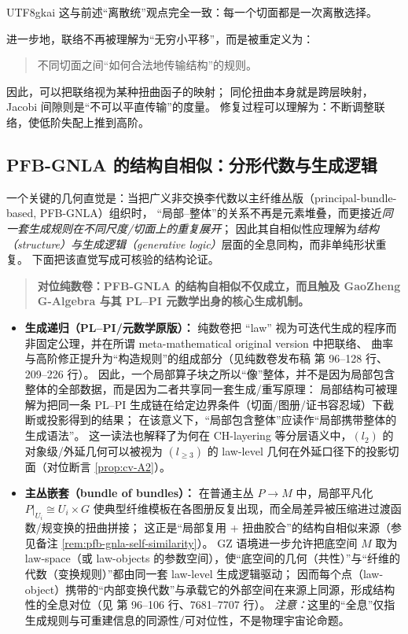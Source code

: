 \documentclass[12pt]{article}
\begin{document}
\begin{CJK*}{UTF8}{gkai}
这与前述“离散统”观点完全一致：每一个切面都是一次离散选择。

进一步地，联络不再被理解为“无穷小平移”，而是被重定义为：
\begin{quote}
不同切面之间“如何合法地传输结构”的规则。
\end{quote}

因此，可以把联络视为某种扭曲函子的映射；
同伦扭曲本身就是跨层映射，Jacobi 间隙则是“不可以平直传输”的度量。
修复过程可以理解为：不断调整联络，使低阶失配上推到高阶。

\subsection{PFB-GNLA 的结构自相似：分形代数与生成逻辑}\label{subsec:pfb-gnla-fractal}

一个关键的几何直觉是：当把广义非交换李代数以主纤维丛版（principal-bundle-based, PFB-GNLA）组织时，
“局部--整体”的关系不再是元素堆叠，而更接近\emph{同一套生成规则在不同尺度/切面上的重复展开}；
因此其自相似性应理解为\emph{结构（structure）与生成逻辑（generative logic）}层面的全息同构，而非单纯形状重复。
下面把该直觉写成可核验的结构论证。
\begin{quote}
\textbf{对位纯数卷：PFB-GNLA 的结构自相似不仅成立，而且触及 GaoZheng G-Algebra 与其 PL--PI 元数学出身的核心生成机制。}
\end{quote}

\begin{itemize}
  \item \textbf{生成递归（PL--PI/元数学原版）：}
        纯数卷把 “law” 视为可迭代生成的程序而非固定公理，并在所谓 meta-mathematical original version 中把联络、
      曲率与高阶修正提升为“构造规则”的组成部分（见纯数卷发布稿\cite{GaoZheng2025GFramework} 第 96--128 行、209--226 行）。
        因此，一个局部算子块之所以“像”整体，并不是因为局部包含整体的全部数据，而是因为二者共享同一套生成/重写原理：
        局部结构可被理解为把同一条 PL--PI 生成链在给定边界条件（切面/图册/证书容忍域）下截断或投影得到的结果；
        在该意义下，“局部包含整体”应读作“局部携带整体的生成语法”。
        这一读法也解释了为何在 CH-layering 等分层语义中，$(l_2)$ 的对象级/外延几何可以被视为 $(l_{\ge3})$ 的 law-level 几何在外延口径下的投影切面（对位断言 \ref{prop:cv-A2}）。

  \item \textbf{主丛嵌套（bundle of bundles）：}
        在普通主丛 $P\to M$ 中，局部平凡化 $P|_{U_i}\cong U_i\times G$ 使典型纤维模板在各图册反复出现，而全局差异被压缩进过渡函数/规变换的扭曲拼接；
        这正是“局部复用 + 扭曲胶合”的结构自相似来源（参见备注 \ref{rem:pfb-gnla-self-similarity}）。
        GZ 语境进一步允许把底空间 $M$ 取为 law-space（或 law-objects 的参数空间），使“底空间的几何（共性）”与“纤维的代数（变换规则）”都由同一套 law-level 生成逻辑驱动；
        因而每个点（law-object）携带的“内部变换代数”与承载它的外部空间在来源上同源，形成结构性的全息对位（见\cite{GaoZheng2025GFramework} 第 96--106 行、7681--7707 行）。
        \emph{注意：}这里的“全息”仅指生成规则与可重建信息的同源性/可对位性，不是物理宇宙论命题。


\end{itemize}
\end{CJK*}
\end{document}

